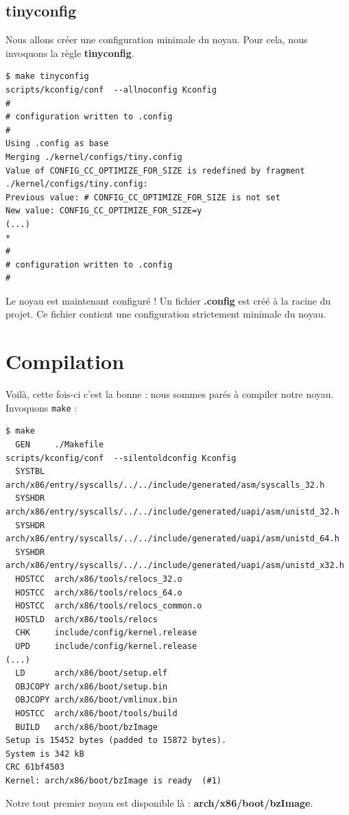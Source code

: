 \documentclass[a4paper]{article}
\begin{document}
\subsection{tinyconfig}

Nous allons créer une configuration minimale du noyau. Pour cela, nous invoquons la règle \textbf{tinyconfig}.

\begin{lstlisting}[style=consoleOutputSyle]
$ make tinyconfig
scripts/kconfig/conf  --allnoconfig Kconfig
#
# configuration written to .config
#
Using .config as base
Merging ./kernel/configs/tiny.config
Value of CONFIG_CC_OPTIMIZE_FOR_SIZE is redefined by fragment ./kernel/configs/tiny.config:
Previous value: # CONFIG_CC_OPTIMIZE_FOR_SIZE is not set
New value: CONFIG_CC_OPTIMIZE_FOR_SIZE=y
(...)
*
#
# configuration written to .config
#
\end{lstlisting}

Le noyau est maintenant configuré ! Un fichier \textbf{.config} est créé à la racine du projet. Ce fichier contient une configuration strictement minimale du noyau.

\section{Compilation}

Voilà, cette fois-ci c'est la bonne : nous sommes parés à compiler notre noyau. Invoquons \lstset{language=sh}\lstinline{make} :
\bigskip

\begin{lstlisting}[style=consoleOutputSyle]
$ make
  GEN     ./Makefile
scripts/kconfig/conf  --silentoldconfig Kconfig
  SYSTBL  arch/x86/entry/syscalls/../../include/generated/asm/syscalls_32.h
  SYSHDR  arch/x86/entry/syscalls/../../include/generated/uapi/asm/unistd_32.h
  SYSHDR  arch/x86/entry/syscalls/../../include/generated/uapi/asm/unistd_64.h
  SYSHDR  arch/x86/entry/syscalls/../../include/generated/uapi/asm/unistd_x32.h
  HOSTCC  arch/x86/tools/relocs_32.o
  HOSTCC  arch/x86/tools/relocs_64.o
  HOSTCC  arch/x86/tools/relocs_common.o
  HOSTLD  arch/x86/tools/relocs
  CHK     include/config/kernel.release
  UPD     include/config/kernel.release
(...)
  LD      arch/x86/boot/setup.elf
  OBJCOPY arch/x86/boot/setup.bin
  OBJCOPY arch/x86/boot/vmlinux.bin
  HOSTCC  arch/x86/boot/tools/build
  BUILD   arch/x86/boot/bzImage
Setup is 15452 bytes (padded to 15872 bytes).
System is 342 kB
CRC 61bf4503
Kernel: arch/x86/boot/bzImage is ready  (#1)
\end{lstlisting}

Notre tout premier noyau est disponible là : \textbf{arch/x86/boot/bzImage}.

\clearpage
\listoffigures
\end{document}
